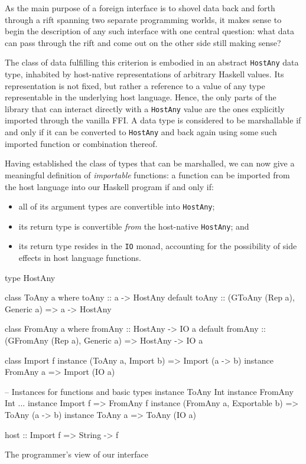 \documentclass[preprint]{sigplanconf}
\begin{document}
As the main purpose of a foreign interface is to shovel data back and
forth through a rift spanning two separate programming worlds, it makes sense
to begin the description of any such interface with one central question:
what data can pass through the rift and come out on the other side still making
sense?

The class of data fulfilling this criterion is embodied in an
abstract \lstinline!HostAny! data type, inhabited by host-native
representations of arbitrary Haskell values. Its representation is not fixed,
but rather a reference to a value of any type representable in the underlying
host language. Hence, the only parts of the library that can interact directly
with a \lstinline!HostAny! value are the ones explicitly imported through the
vanilla FFI.
A data type is considered to be marshallable if and only if it can be
converted to \lstinline!HostAny! and back again using some such imported
function or combination thereof.

Having established the class of types that can be marshalled, we can now give
a meaningful definition of \emph{importable} functions: a function can be
imported from the host language into our Haskell program if and only if:
\begin{itemize}
\item
  all of its argument types are convertible into \lstinline!HostAny!;
\item
  its return type is convertible \emph{from} the host-native
  \lstinline!HostAny!; and
\item
  its return type resides in the \lstinline!IO! monad, accounting for the
  possibility of side effects in host language functions.
\end{itemize}

\begin{listingfloat}
\begin{code}
type HostAny

class ToAny a where
  toAny :: a -> HostAny
  default toAny :: (GToAny (Rep a), Generic a)
                => a -> HostAny

class FromAny a where
  fromAny :: HostAny -> IO a
  default fromAny :: (GFromAny (Rep a), Generic a)
                  => HostAny -> IO a

class Import f
instance (ToAny a, Import b) => Import (a -> b)
instance FromAny a           => Import (IO a)

-- Instances for functions and basic types
instance ToAny Int
instance FromAny Int
...
instance Import f => FromAny f
instance (FromAny a, Exportable b) => ToAny (a -> b)
instance ToAny a => ToAny (IO a)

host :: Import f => String -> f
\end{code}
\caption{The programmer's view of our interface}
\label{lst:interface}
\end{listingfloat}
\end{document}
